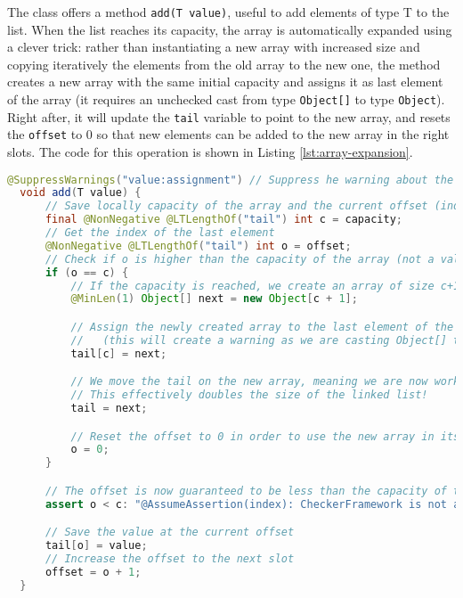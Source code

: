 \documentclass[a4paper, 11pt]{article}
\begin{document}
The class offers a method \texttt{add(T value)}, useful to add elements of type T to the list. When the list reaches its capacity, the array is automatically expanded using a clever trick: rather than instantiating a new array with increased size and copying iteratively the elements from the old array to the new one, the method creates a new array with the same initial capacity and assigns it as last element of the array (it requires an unchecked cast from type \texttt{Object[]} to type \texttt{Object}). Right after, it will update the \texttt{tail} variable to point to the new array, and resets the \texttt{offset} to 0 so that new elements can be added to the new array in the right slots. The code for this operation is shown in Listing \ref{lst:array-expansion}.

\begin{lstlisting}[language=java,breaklines=true,caption={Expanding the array in the AppendOnlyLinkedArrayList class},label={lst:array-expansion},captionpos=b]
  @SuppressWarnings("value:assignment") // Suppress he warning about the unchecked cast
  void add(T value) {
      // Save locally capacity of the array and the current offset (index to save next element)
      final @NonNegative @LTLengthOf("tail") int c = capacity;
      // Get the index of the last element
      @NonNegative @LTLengthOf("tail") int o = offset;
      // Check if o is higher than the capacity of the array (not a valid index)
      if (o == c) {
          // If the capacity is reached, we create an array of size c+1 (we double the size)
          @MinLen(1) Object[] next = new Object[c + 1];

          // Assign the newly created array to the last element of the current array
          //   (this will create a warning as we are casting Object[] to Object)
          tail[c] = next;

          // We move the tail on the new array, meaning we are now working on the newly created array
          // This effectively doubles the size of the linked list!
          tail = next;

          // Reset the offset to 0 in order to use the new array in its entirely
          o = 0;
      }

      // The offset is now guaranteed to be less than the capacity of the array!
      assert o < c: "@AssumeAssertion(index): CheckerFramework is not able to understand that o is always less than c";

      // Save the value at the current offset
      tail[o] = value;
      // Increase the offset to the next slot
      offset = o + 1;
  }
\end{lstlisting}
\end{document}
